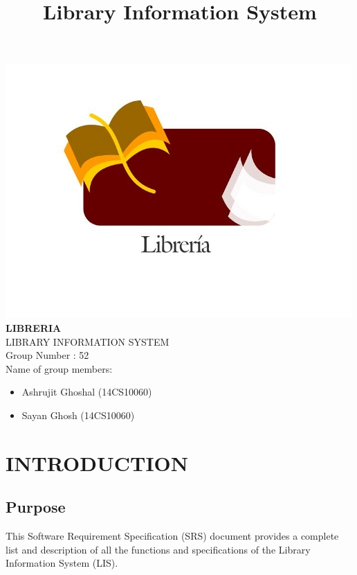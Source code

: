 \documentclass{article}
\title{\textbf{Library Information System}}
\author{}
\date{}
\begin{document}
\maketitle
\begin{center}
\includegraphics[scale=0.6]{images/logoLIS_modified.jpg}
\\
\textbf{LIBRERIA}\\
LIBRARY INFORMATION SYSTEM\\
Group Number : 52\\
 Name of group members: \\
\begin{itemize}
\item \begin{center}Ashrujit Ghoshal (14CS10060)\end{center}
\item \begin{center}Sayan Ghosh (14CS10060)\end{center}
\end{itemize}

\end{center}

\newpage
\hypertarget{toc}{}
\tableofcontents
\newpage

\section{INTRODUCTION}

\subsection{Purpose}
This Software Requirement Specification (SRS) document provides a complete list and description of all the functions and specifications of the Library Information System (LIS).
\end{document}
